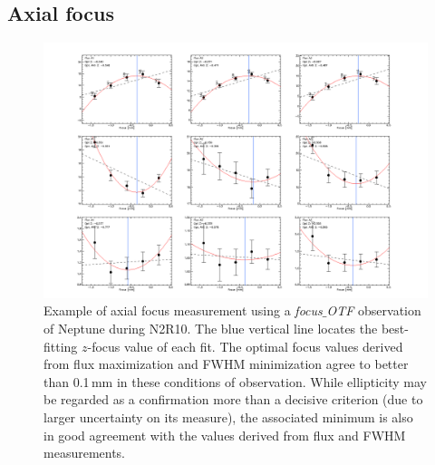 \subsection{Axial focus}
\label{se:axial_focus}

\begin{figure}[ht!]
\begin{center}
  \includegraphics[clip, angle=0, trim={1.5cm, 1cm, 1.5cm, 1cm}, width=\textwidth]{Figures/plot_20170419s143.png}
\caption[Axial focus measurement]{Example of axial focus measurement using a
  \emph{focus$\_$OTF} observation of Neptune during N2R10.  
  The blue vertical line locates the best-fitting $z$-focus value of
  each fit. The optimal focus values derived from flux
  maximization and FWHM minimization agree to better than 0.1\,mm in these
  conditions of observation. While ellipticity may be regarded as a confirmation
  more than a decisive criterion (due to larger uncertainty on its measure), the
  associated minimum is also in good agreement with the values derived from flux
  and FWHM measurements.}
\label{fig:focus-example}
\end{center}
\end{figure}

